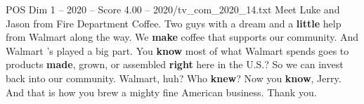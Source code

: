 \begin{textsample}{POS Dim 1 – 2020 – Score 4.00 – 2020/tv\_com\_2020\_14.txt}  \label{ex:f1_pos_082}
Meet Luke and Jason from Fire Department Coffee.
Two guys with a dream and a \textbf{little} help from Walmart along the way.
We \textbf{make} coffee that supports our community.
And Walmart 's played a big part.
You \textbf{know} most of what Walmart spends goes to products \textbf{made}, grown, or assembled \textbf{right} here in the U.S.?
So we can invest back into our community.
Walmart, huh?
Who \textbf{knew}?
Now you \textbf{know}, Jerry.
And that is how you brew a mighty fine American business.
Thank you.

\end{textsample}
